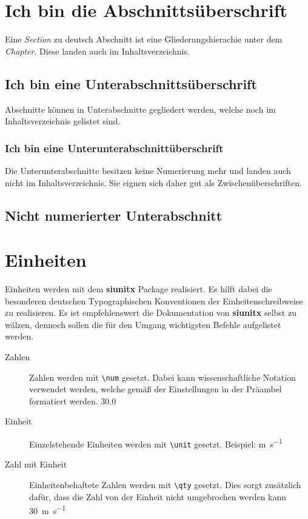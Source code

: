 \documentclass[logo/language=en]{tudcdartcl}
\begin{document}
\section{Ich bin die Abschnittsüberschrift}

Eine \textit{Section} zu deutsch Abschnitt ist eine Gliederungshierachie unter dem \textit{Chapter}. Diese landen auch im Inhaltsverzeichnis.

\subsection{Ich bin eine Unterabschnittsüberschrift}

Abschnitte können in Unterabschnitte gegliedert werden, welche noch im Inhaltsverzeichnis gelistet sind.

\subsubsection{Ich bin eine Unterunterabschnittüberschrift}

Die Unterunterabschnitte besitzen keine Numerierung mehr und landen auch nicht im Inhaltsverzeichnis. Sie eignen sich daher gut als Zwischenüberschriften.

\subsection*{Nicht numerierter Unterabschnitt}

\section{Einheiten}

Einheiten werden mit dem \textbf{siunitx} Package realisiert. Es hilft dabei die besonderen deutschen Typographischen Konventionen der Einheitenschreibweise zu realisieren. Es ist empfehlenswert die Dokumentation von \textbf{siunitx} selbst zu wälzen, dennoch sollen die für den Umgang wichtigsten Befehle aufgelistet werden.

\begin{description}
    \item[Zahlen] Zahlen werden mit \verb!\num! gesetzt. Dabei kann wissenschaftliche Notation verwendet werden, welche gemäß der Einstellungen in der Präambel formatiert werden.
    \num{30.0}
    \item[Einheit] Einzelstehende Einheiten werden mit \verb!\unit! gesetzt. Beispiel: \unit{\m\per\s}
    \item[Zahl mit Einheit] Einheitenbehaftete Zahlen werden mit \verb!\qty! gesetzt. Dies sorgt zusätzlich dafür, dass die Zahl von der Einheit nicht umgebrochen werden kann \qty{30}{\m\per\s}
\end{description}
\end{document}
